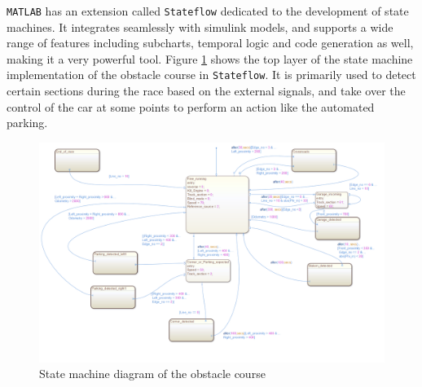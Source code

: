\verb!MATLAB! has an extension called \verb!Stateflow! dedicated to the development of state machines. It integrates seamlessly with simulink models, and supports a wide range of features including subcharts, temporal logic and code generation as well, making it a very powerful tool. Figure \ref{fig:stateflow} shows the top layer of the state machine implementation of the obstacle course in \verb!Stateflow!. It is primarily used to detect certain sections during the race based on the external signals, and take over the control of the car at some points to perform an action like the automated parking.

\begin{figure}[!ht]
    \centering
    \includegraphics[width=0.7\linewidth]{img/stateflow}
    \centering
    \caption{State machine diagram of the obstacle course}
    \label{fig:stateflow}
\end{figure}





